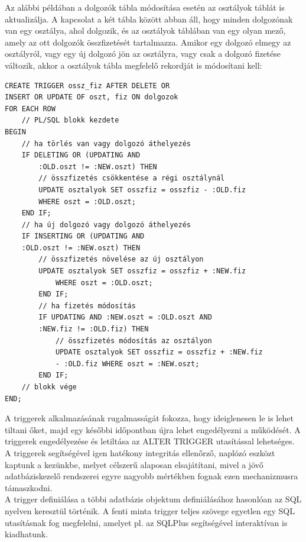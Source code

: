 \documentclass[tikz,12pt,margin=0px]{article}
\begin{document}
    \noindent Az alábbi példában a dolgozók tábla módosítása esetén az osztályok táblát is aktualizálja. A kapcsolat a két tábla között abban áll, hogy minden dolgozónak van egy osztálya, ahol dolgozik, és az osztályok táblában van egy olyan mező, amely az ott dolgozók összfizetését tartalmazza. Amikor egy dolgozó elmegy az osztályról, vagy egy új dolgozó jön az osztályra, vagy csak a dolgozó fizetése változik, akkor a osztályok tábla megfelelő rekordját is módosítani kell:
{\small
\begin{verbatim}
CREATE TRIGGER ossz_fiz AFTER DELETE OR
INSERT OR UPDATE OF oszt, fiz ON dolgozok
FOR EACH ROW
	// PL/SQL blokk kezdete
BEGIN
    // ha törlés van vagy dolgozó áthelyezés
    IF DELETING OR (UPDATING AND
        :OLD.oszt != :NEW.oszt) THEN
        // összfizetés csökkentése a régi osztálynál
        UPDATE osztalyok SET osszfiz = osszfiz - :OLD.fiz
        WHERE oszt = :OLD.oszt;
    END IF;
    // ha új dolgozó vagy dolgozó áthelyezés
    IF INSERTING OR (UPDATING AND
    :OLD.oszt != :NEW.oszt) THEN
        // összfizetés növelése az új osztályon
        UPDATE osztalyok SET osszfiz = osszfiz + :NEW.fiz
            WHERE oszt = :OLD.oszt;
        END IF;
        // ha fizetés módosítás
        IF UPDATING AND :NEW.oszt = :OLD.oszt AND
        :NEW.fiz != :OLD.fiz) THEN
            // összfizetés módosítás az osztályon
            UPDATE osztalyok SET osszfiz = osszfiz + :NEW.fiz
            - :OLD.fiz WHERE oszt = :NEW.oszt;
        END IF;
    // blokk vége
END;
\end{verbatim}
}
    \noindent A triggerek alkalmazásának rugalmasságát fokozza, hogy ideiglenesen le is lehet tiltani őket, majd egy későbbi időpontban újra lehet engedélyezni a működését. A triggerek engedélyezése és letiltása  az ALTER TRIGGER utasítással lehetséges.\\

    \noindent A triggerek segítségével igen hatékony integritás ellenőrző, naplózó eszközt kaptunk a kezünkbe, melyet célszerű alaposan elsajátítani, mivel a jövő adatbáziskezelő rendszerei egyre nagyobb mértékben fognak ezen mechanizmusra támaszkodni.\\

    \noindent A trigger definiálása a többi adatbázis objektum definiálásához hasonlóan az SQL nyelven keresztül történik. A fenti minta trigger teljes szövege egyetlen egy SQL utasításnak fog megfelelni, amelyet pl. az SQLPlus segítségével interaktívan is kiadhatunk.\\
\end{document}
